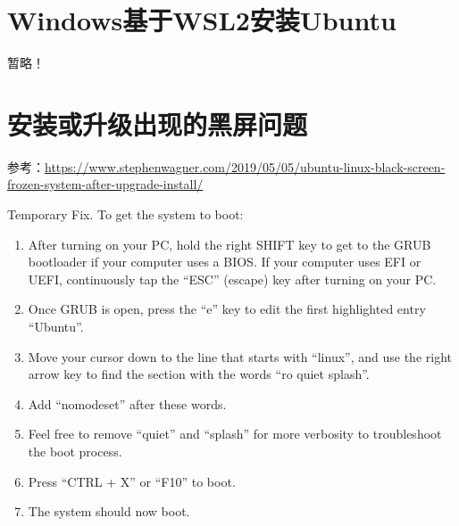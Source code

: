 \section{Windows基于WSL2安装Ubuntu}
暂略！



\section{安装或升级出现的黑屏问题}
参考：\url{https://www.stephenwagner.com/2019/05/05/ubuntu-linux-black-screen-frozen-system-after-upgrade-install/}

Temporary Fix. To get the system to boot:
\begin{enumerate}
\item After turning on your PC, hold the right SHIFT key to get to the GRUB bootloader if your computer uses a BIOS. If your computer uses EFI or UEFI, continuously tap the “ESC” (escape) key after turning on your PC.

\item Once GRUB is open, press the “e” key to edit the first highlighted entry “Ubuntu”.

\item Move your cursor down to the line that starts with “linux”, and use the right arrow key to find the section with the words “ro quiet splash”.

\item Add “nomodeset” after these words.

\item Feel free to remove “quiet” and “splash” for more verbosity to troubleshoot the boot process.

\item Press “CTRL + X” or “F10” to boot.

\item The system should now boot.
\end{enumerate}


